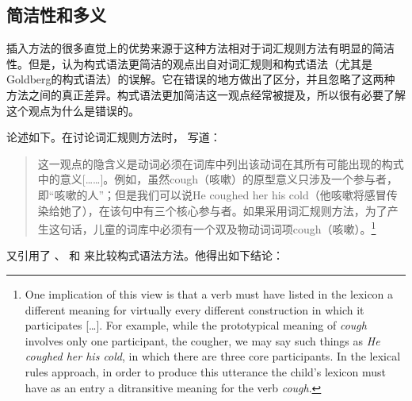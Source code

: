 \subsection{简洁性和多义}
\label{polysemy-subsec}

    插入方法的很多直觉上的优势来源于这种方法相对于词汇规则方法有明显的简洁性。但是，认为构式语法更简洁的观点出自对词汇规则和构式语法（尤其是Goldberg\citeyearpar{Goldberg95a,Goldberg2006a}的构式语法）的误解。它在错误的地方做出了区分，并且忽略了这两种方法之间的真正差异。构式语法更加简洁这一观点经常被提及，所以很有必要了解这个观点为什么是错误的。

     \citet{Tomasello2003a}论述如下。在讨论词汇规则方法时， \citet[]{Tomasello2003a}写道：   

\begin{quotation}
这一观点的隐含义是动词必须在词库中列出该动词在其所有可能出现的构式中的意义[……]。例如，虽然cough（咳嗽）的原型意义只涉及一个参与者，即“咳嗽的人”；但是我们可以说He coughed her his cold（他咳嗽将感冒传染给她了），在该句中有三个核心参与者。如果采用词汇规则方法，为了产生这句话，儿童的词库中必须有一个双及物动词词项cough（咳嗽）。\citep[]{Tomasello2003a}\footnote{%
One implication of this view is that a verb must have listed in the lexicon a different meaning for
virtually every different construction in which it participates [\ldots].  For example, while the
prototypical meaning of \emph{cough} involves only one participant, the cougher, we may say such
things as \emph{He coughed her his cold}, in which there are three core participants.  In the
lexical rules approach, in order to produce this utterance the child's lexicon must have as an entry
a ditransitive meaning for the verb \emph{cough}.
}
\end{quotation}
 \citet[]{Tomasello2003a}又引用了 \citet{FKoC88a}、 \citet{Goldberg95a}和 \citet{Croft2001a}来比较构式语法方法。他得出如下结论：


